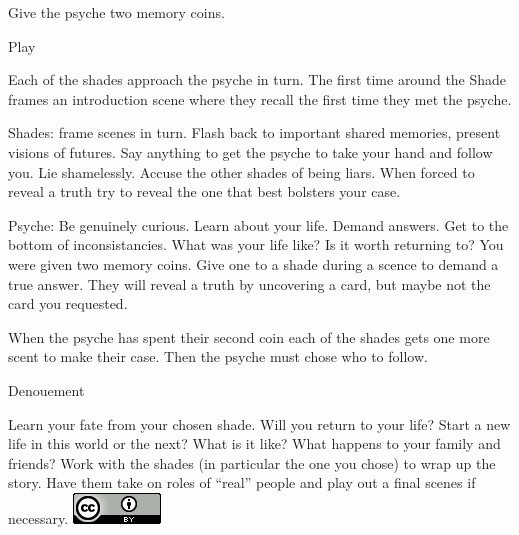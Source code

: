 \documentclass[letterpaper,12pt,landscape,twocolumn]{book}
\begin{document}
Give the psyche two memory coins.

Play

Each of the shades approach the psyche in turn. The first time around
the Shade frames an introduction scene where they recall the first
time they met the psyche. 

Shades: frame scenes in turn. Flash back to important shared
memories, present visions of futures. Say anything to get the psyche
to take your hand and follow you. Lie shamelessly. Accuse the other shades
of being liars. When forced to reveal a truth try to reveal the one
that best bolsters your case.

Psyche: Be genuinely curious. Learn about your life. Demand
answers. Get to the bottom of inconsistancies. What was your life
like? Is it worth returning to? You were given two memory coins. Give
one to a shade during a scence to demand a true answer. They will
reveal a truth by uncovering a card, but maybe not the card you
requested. 

When the psyche has spent their second coin each of the shades gets
one more scent to make their case. Then the psyche must chose who to
follow.

Denouement

Learn your fate from your chosen shade. Will you return to your life?
Start a new life in this world or the next? What is it like? What
happens to your family and friends? Work with the shades (in
particular the one you chose) to wrap up the story. Have them take on
roles of ``real'' people and play out a final scenes if necessary.
\includegraphics{./images/cc4by_logo.png}
\end{document}

